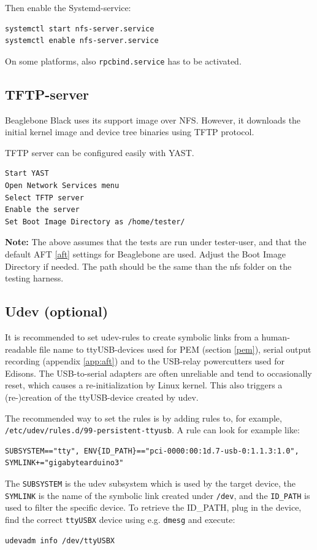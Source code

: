 \documentclass[a4paper,11pt]{article}
\newcommand{\note}{\textbf{Note: }}
\newcommand{\cmd}[1]{\texttt{#1}}
\begin{document}
Then enable the Systemd-service:
\begin{lstlisting}
systemctl start nfs-server.service
systemctl enable nfs-server.service
\end{lstlisting}
On some platforms, also \cmd{rpcbind.service} has to be activated.

\subsection*{TFTP-server}

Beaglebone Black uses its support image over NFS. However, it downloads the initial kernel image and device tree binaries using TFTP protocol.

TFTP server can be configured easily with YAST.

\begin{lstlisting}
Start YAST
Open Network Services menu
Select TFTP server
Enable the server
Set Boot Image Directory as /home/tester/
\end{lstlisting}

\note The above assumes that the tests are run under tester-user, and that the default AFT \ref{aft} settings for Beaglebone are used. Adjust the Boot Image Directory if needed. The path should be the same than the nfs folder on the testing harness.

\subsection*{Udev (optional)}
It is recommended to set udev-rules to create symbolic links from a human-readable file name to ttyUSB-devices used for PEM (section \ref{pem}), serial output recording (appendix \ref{app:aft}) and to the USB-relay powercutters used for Edisons. The USB-to-serial adapters are often unreliable and tend to occasionally reset, which causes a re-initialization by Linux kernel. This also triggers a (re-)creation of the ttyUSB-device created by udev.

The recommended way to set the rules is by adding rules to, for example, \\ \cmd{/etc/udev/rules.d/99-persistent-ttyusb}. A rule can look for example like:
\begin{lstlisting}
SUBSYSTEM=="tty", ENV{ID_PATH}=="pci-0000:00:1d.7-usb-0:1.1.3:1.0", SYMLINK+="gigabytearduino3"
\end{lstlisting}
The \cmd{SUBSYSTEM} is the udev subsystem which is used by the target device, the \cmd{SYMLINK} is the name of the symbolic link created under \cmd{/dev}, and the \cmd{ID\_PATH} is used to filter the specific device. To retrieve the {ID\_PATH}, plug in the device, find the correct \cmd{ttyUSBX} device using e.g. \cmd{dmesg} and execute:
\begin{lstlisting}
udevadm info /dev/ttyUSBX
\end{lstlisting}
\end{document}
